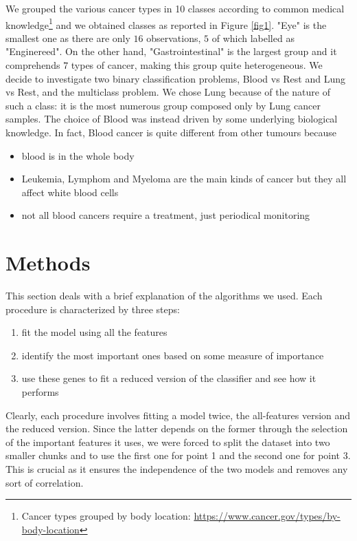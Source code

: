 \documentclass[a4paper,11pt, oneside]{article}  %
\begin{document}
We  grouped the various cancer types in 10 classes according to common medical knowledge\footnote{Cancer types grouped by body location: \url{https://www.cancer.gov/types/by-body-location}} and we obtained classes as reported in Figure \ref{fig1}.  "Eye" is the smallest one as there are only $16$ observations, $5$ of which labelled as "Enginereed". On the other hand, "Gastrointestinal" is the largest group and it comprehends $7$ types of cancer,  making this group quite heterogeneous.
We decide to investigate two binary classification problems,  Blood vs Rest and Lung vs Rest, and the multiclass problem. We chose Lung because of the nature of such a class: it is the most numerous group composed only by Lung cancer samples. The choice of Blood was instead driven by some underlying biological knowledge. In fact,  Blood cancer is quite different from other tumours because
\begin{itemize}
	\item blood is in the whole body
	\item Leukemia, Lymphom and Myeloma are the main kinds of cancer but they all affect white blood cells
	\item not all blood cancers require a treatment, just periodical monitoring
\end{itemize} 


\section{Methods}
This section deals with a brief explanation of the algorithms we used.  Each procedure is characterized by three steps:
\begin{enumerate}
\item fit the model using all the features
\item identify the most important ones based on some measure of importance
\item use these genes to fit a reduced version of the classifier and see how it performs
\end{enumerate}
Clearly,  each procedure involves fitting a model twice,  the all-features version and the reduced version.  Since the latter depends on the former through the selection of the important features it uses,  we were forced to split the dataset into two smaller chunks and to use the first one for point 1 and the second one for point 3.  This is crucial as it ensures the independence of the two models and removes any sort of correlation. 
\end{document}
